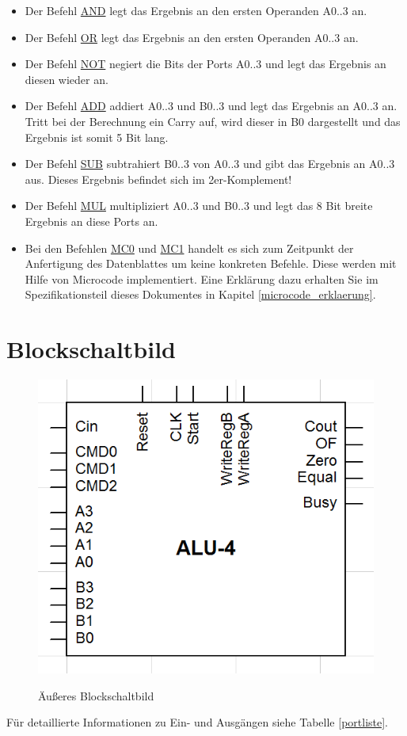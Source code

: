 \documentclass[11pt]{report}
\begin{document}
	\begin{itemize}
		\item Der Befehl \underline{AND} legt das Ergebnis an den ersten Operanden A0..3 an.
		\item Der Befehl \underline{OR} legt das Ergebnis an den ersten Operanden A0..3 an.
		\item Der Befehl \underline{NOT} negiert die Bits der Ports A0..3 und legt das Ergebnis an diesen wieder an.
		\item Der Befehl \underline{ADD} addiert A0..3 und B0..3 und legt das Ergebnis an A0..3 an. Tritt bei der Berechnung ein Carry auf, wird dieser in B0 dargestellt und das Ergebnis ist somit 5 Bit lang.
		\item Der Befehl \underline{SUB} subtrahiert B0..3 von A0..3 und gibt das Ergebnis an A0..3 aus. Dieses Ergebnis befindet sich im 2er-Komplement!
		\item Der Befehl \underline{MUL} multipliziert A0..3 und B0..3 und legt das 8 Bit breite Ergebnis an diese Ports an.
		\item Bei den Befehlen \underline{MC0} und \underline{MC1} handelt es sich zum Zeitpunkt der Anfertigung des Datenblattes um keine konkreten Befehle. Diese werden mit Hilfe von Microcode implementiert. Eine Erklärung dazu erhalten Sie im Spezifikationsteil dieses Dokumentes in Kapitel \ref{microcode_erklaerung}.
	\end{itemize}
	
	\section{Blockschaltbild}
	\begin{figure}[h]
		\begin{center}
			\includegraphics[]{aeusseresBlockschaltbild}
			\label{aeusseresBlockschaltbild}
			\caption{Äußeres Blockschaltbild}\label{aeusseresBlockschaltbild}
		\end{center}
	\end{figure}
	\FloatBarrier
	Für detaillierte Informationen zu Ein- und Ausgängen siehe Tabelle \ref{portliste}.\\
	
\end{document}
